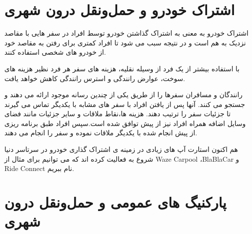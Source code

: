 \section{اشتراک خودرو و حمل‌و‌نقل درون شهری}
اشتراک خودرو به معنی به اشتراک گذاشتن خودرو توسط افراد در سفر هایی با مقاصد نزدیک به هم است و در نتیجه سبب می شود تا افراد کمتری برای رفتن به مقاصد خود از خودرو های شخصی استفاده کنند.

با استفاده بیشتر از یک فرد از وسیله نقلیه، هزینه های سفر هر فرد نظیر  هزینه های سوخت، عوارض رانندگی و استرس رانندگی کاهش خواهد یافت.

رانندگان و مسافران سفرها را از طریق یکی از چندین رسانه موجود ارائه می دهند و جستجو می کنند. آنها پس از یافتن افراد با سفر های مشابه با یکدیگر تماس می گیرند تا جزئیات سفر را ترتیب دهند. هزینه ها،‌نقاط ملاقات و سایر جزئیات مانند فضای وسایل اضافه همراه افراد نیز از پیش توافق شده است.‌‌سپس افراد طبق برنامه ریزی از پیش انجام شده با یکدیگر ملاقات نموده و سفر را انجام می دهند.

هم اکنون استارت آپ های زیادی در زمینه ی اشتراک گذاری خودرو در سرتاسر دنیا شروع به فعالیت کرده اند که می توانیم برای مثال از Waze Carpool ،‌BlaBlaCar و Ride Connect نام ببریم.

\section{پارکنیگ های عمومی و حمل‌و‌نقل درون شهری}






















